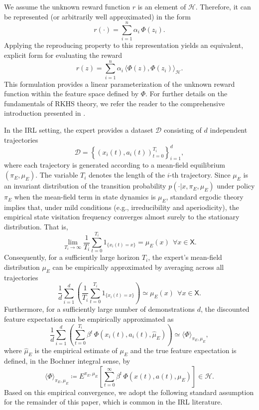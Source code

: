 \documentclass[11pt]{article}
\newcommand{\sX}{{\mathsf X}}
\newcommand{\cH}{{\mathcal H}}
\newcommand{\D}{{\mathcal D}}
\begin{document}
We assume the unknown reward function $r$ is an element of $\mathcal{H}$. Therefore, it can be represented (or arbitrarily well approximated) in the form
\[
r(\cdot) = \sum_{i=1}^n \alpha_i \, \Phi(z_i).
\]
Applying the reproducing property to this representation yields an equivalent, explicit form for evaluating the reward 
\[
r(z) = \sum_{i=1}^n \alpha_i \, \langle \Phi(z), \Phi(z_i) \rangle_{\mathcal{H}}.
\]
This formulation provides a linear parameterization of the unknown reward function within the feature space defined by $\Phi$. For further details on the fundamentals of RKHS theory, we refer the reader to the comprehensive introduction presented in \cite{PaRa16}.


In the IRL setting,  the expert provides a dataset $\mathcal{D}$ consisting of $d$ independent trajectories
$$
\D=\left\{\left(x_i(t),a_i(t)\right)_{t=0}^{T_i}\right\}_{i=1}^d,
$$
where each trajectory is generated according to a mean-field equilibrium $(\pi_E, \mu_E)$. The variable $T_i$ denotes the length of the $i$-th trajectory. Since $\mu_E$ is an invariant distribution of the transition probability $p(\cdot|x,\pi_E,\mu_E)$ under policy $\pi_E$ when the mean-field term in state dynamics is $\mu_E$, standard ergodic theory implies that, under mild conditions (e.g., irreducibility and aperiodicity), the empirical state visitation frequency converges almost surely to the stationary distribution. That is,
$$
\lim_{T_i\rightarrow \infty} \frac{1}{T_i} \sum_{t=0}^{T_i}  1_{\{x_i(t)=x\}}  = \mu_E(x) ~~\forall x \in \sX.
$$
Consequently, for a sufficiently large horizon $T_i$, the expert's mean-field distribution $\mu_E$ can be empirically approximated by averaging across all trajectories
$$
\frac{1}{d}  \sum_{i=1}^d \left(\frac{1}{T_i} \sum_{t=0}^{T_i}  1_{\{x_i(t)=x\}} \right) \simeq \mu_E(x) ~~ \forall x \in \sX.
$$
Furthermore, for a sufficiently large number of demonstrations $d$, the discounted feature expectation can be empirically approximated as
\begin{equation*}
\frac{1}{d} \sum_{i=1}^d \left( \sum_{t=0}^{T_i} \beta^t \, \Phi(x_i(t),a_i(t),\hat \mu_E) \right) \simeq \langle \Phi \rangle_{\pi_E,\mu_E},
\end{equation*}
where $\hat{\mu}_E$ is the empirical estimate of $\mu_E$ and the true feature expectation is defined, in the Bochner integral sense, by
$$\langle \Phi \rangle_{\pi_E,\mu_E} \coloneqq E^{\pi_E,\mu_E}\left[\sum_{t=0}^{\infty} \beta^t \,\Phi(x(t),a(t),\mu_E)\right] \in \cH.$$
Based on this empirical convergence, we adopt the following standard assumption for the remainder of this paper, which is common in the IRL literature.
\end{document}
